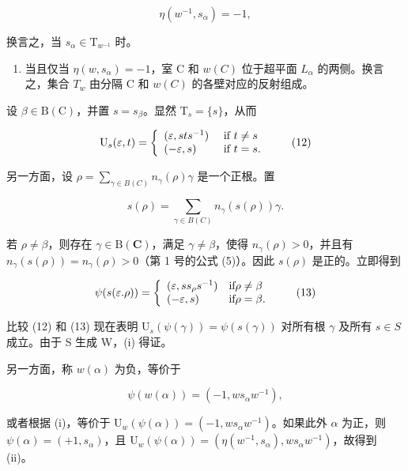 \[
\eta (w ^ {- 1}, s _ {\alpha}) = - 1,
\]

换言之，当 \(s_{\alpha} \in \mathrm{T}_{w^{-1}}\) 时。

\begin{enumerate}
\def\labelenumi{(\roman{enumi})}
\setcounter{enumi}{2}
\tightlist
\item
当且仅当 \(\eta(w,s_{\alpha})=-1\)，室 C 和 \(w(C)\) 位于超平面 \(L_{\alpha}\) 的两侧。换言之，集合 \(T_{w}\) 由分隔 C 和 \(w(C)\) 的各壁对应的反射组成。
\end{enumerate}

设 \(\beta \in \mathrm{B}(\mathrm{C})\)，并置 \(s = s_{\beta}\)。显然 \(\mathrm{T}_s = \{s\}\)，从而

\[
\mathrm{U} _ {s} (\varepsilon , t) = \left\{ \begin{array}{l l} (\varepsilon , s t s ^ {- 1}) & \text { if } t \neq s \\ (- \varepsilon , s) & \text { if } t = s. \end{array} \right.\tag{12}
\]

另一方面，设 \(\rho = \sum_{\gamma \in B(C)} n_{\gamma}(\rho) \gamma\) 是一个正根。置

\[
s (\rho) = \sum_ {\gamma \in B (C)} n _ {\gamma} (s (\rho)) \gamma .
\]

若 \(\rho \neq \beta\)，则存在 \(\gamma \in \mathrm{B}(\mathbf{C})\)，满足 \(\gamma \neq \beta\)，使得 \(n_{\gamma}(\rho) > 0\)，并且有 \(n_{\gamma}(s(\rho)) = n_{\gamma}(\rho) > 0\)（第 1 号的公式 (5)）。因此 \(s(\rho)\) 是正的。立即得到

\[
\psi (s (\varepsilon . \rho)) = \left\{ \begin{array}{l l} (\varepsilon , s s _ {\rho} s ^ {- 1}) & \text {if} \rho \neq \beta \\ (- \varepsilon , s) & \text {if} \rho = \beta . \end{array} \right.\tag{13}
\]

比较 (12) 和 (13) 现在表明 \(\mathrm{U}_{s}(\psi(\gamma)) = \psi(s(\gamma))\) 对所有根 \(\gamma\) 及所有 \(s \in S\) 成立。由于 S 生成 W，(i) 得证。

另一方面，称 \(w(\alpha)\) 为负，等价于

\[
\psi (w (\alpha)) = (- 1, w s _ {\alpha} w ^ {- 1}),
\]

或者根据 (i)，等价于 \(\mathrm{U}_w(\psi (\alpha)) = (-1, ws_{\alpha}w^{-1})\)。如果此外 \(\alpha\) 为正，则 \(\psi (\alpha) = (+1,s_{\alpha})\)，且 \(\mathrm{U}_w(\psi (\alpha)) = (\eta (w^{-1},s_{\alpha}),ws_{\alpha}w^{-1})\)，故得到 (ii)。

